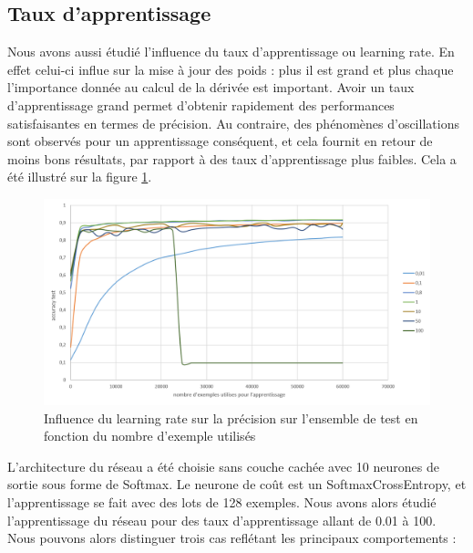 \documentclass{report}
\begin{document}
\subsection{Taux d'apprentissage}
Nous avons aussi étudié l'influence du taux d'apprentissage ou learning rate. En effet celui-ci influe sur la mise à jour des poids : plus il est grand et plus chaque l'importance donnée au calcul de la dérivée est important. Avoir un taux d'apprentissage grand permet d’obtenir rapidement des performances satisfaisantes en termes de précision. Au contraire, des phénomènes d'oscillations sont observés pour un apprentissage conséquent, et cela fournit en retour de moins bons résultats, par rapport à des taux d'apprentissage plus faibles. Cela a été illustré sur la figure \ref{influence_learningrate}.

\begin{figure}[!h]
\begin{center}
\includegraphics[scale=0.6]{images/influence_learningrate.png}
\caption{Influence du learning rate sur la précision sur l'ensemble de test en fonction du nombre d'exemple utilisés}
\label{influence_learningrate}
\end{center}
\end{figure}

L'architecture du réseau a été choisie sans couche cachée avec 10 neurones de sortie sous forme de Softmax. Le neurone de coût est un SoftmaxCrossEntropy, et l'apprentissage se fait avec des lots de 128 exemples. Nous avons alors étudié l'apprentissage du réseau pour des taux d'apprentissage allant de 0.01 à 100.
Nous pouvons alors distinguer trois cas reflétant les principaux comportements :
\end{document}
